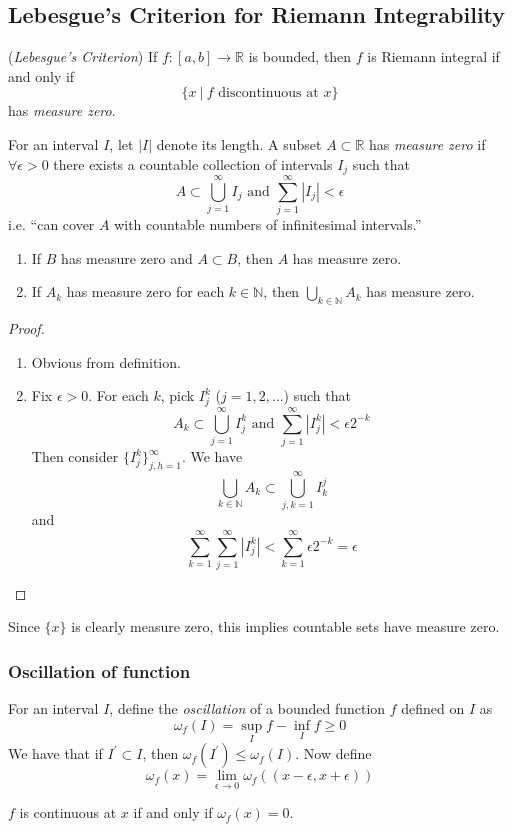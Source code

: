 \documentclass[10pt, a4paper, twoside]{report}
\begin{document}
\subsection{Lebesgue's Criterion for Riemann Integrability}
\begin{theorem}
    (\emph{Lebesgue's Criterion}) If \(f:[a,b]\to\mathbb{R}\) is bounded, then \(f\) is Riemann integral if and only if 
    \[\{x\:|\:f\text{  discontinuous at  }x\}\]
    has \emph{measure zero}.
    \label{thm:lebesgue_criterion}
\end{theorem}
\begin{definition}
    For an interval \(I\), let \(|I|\) denote its length. A subset \(A\subset\mathbb{R}\) has \emph{measure zero} if \(\forall \epsilon>0\) there exists a countable collection of intervals \(I_j\) such that 
    \[A\subset\bigcup_{j=1}^\infty I_j\text{  and  }\sum_{j=1}^{\infty}|I_j|<\epsilon\]
    i.e. ``can cover \(A\) with countable numbers of infinitesimal intervals.''
    \label{def:measure_zero}
\end{definition}
\begin{lemma} \item 
    \begin{enumerate}
        \item If \(B\) has measure zero and \(A\subset B\), then \(A\) has measure zero.
        \item If \(A_k\) has measure zero for each \(k\in\mathbb{N}\), then \(\bigcup_{k\in\mathbb{N}}A_k\) has measure zero.
    \end{enumerate}
\end{lemma}
\begin{proof} \item[]
    \begin{enumerate}
        \item Obvious from definition.
        \item Fix \(\epsilon>0\). For each \(k\), pick \(I_j^k\) (\(j=1,2,\ldots\)) such that 
        \[A_k\subset\bigcup_{j=1}^\infty I_j^k\text{  and  }\sum_{j=1}^{\infty}|I_j^k|<\epsilon 2^{-k}\]
        Then consider \(\{I_j^k\}_{j,h=1}^\infty\). We have 
        \[\bigcup_{k\in\mathbb{N}}A_k\subset\bigcup_{j,k=1}^\infty I_k^j\]
        and 
        \[\sum_{k=1}^{\infty}\sum_{j=1}^\infty|I_j^k|<\sum_{k=1}^{\infty}\epsilon 2^{-k}=\epsilon\]
    \end{enumerate}
\end{proof}
Since \(\{x\}\) is clearly measure zero, this implies countable sets have measure zero.
\subsubsection{Oscillation of function}
For an interval \(I\), define the \emph{oscillation} of a bounded function \(f\) defined on \(I\) as 
\[\omega_f(I)=\sup_I f-\inf_If\geq 0\]
We have that if \(I^\prime\subset I\), then \(\omega_f(I^\prime)\leq\omega_f(I)\). Now define 
\[\omega_f(x)=\lim_{\epsilon\to 0}\omega_f((x-\epsilon,x+\epsilon))\]
\begin{lemma}
    \(f\) is continuous at \(x\) if and only if \(\omega_f(x)=0\).
\end{lemma}
\end{document}
